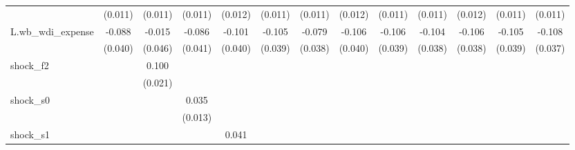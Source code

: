 {\begin{tabular}{l*{12}{c}}
            &     (0.011)         &     (0.011)         &     (0.011)         &     (0.012)         &     (0.011)         &     (0.011)         &     (0.012)         &     (0.011)         &     (0.011)         &     (0.012)         &     (0.011)         &     (0.011)         \\
\addlinespace
L.wb\_wdi\_expense&      -0.088\sym{**} &      -0.015         &      -0.086\sym{**} &      -0.101\sym{**} &      -0.105\sym{**} &      -0.079\sym{**} &      -0.106\sym{**} &      -0.106\sym{**} &      -0.104\sym{**} &      -0.106\sym{**} &      -0.105\sym{**} &      -0.108\sym{***}\\
            &     (0.040)         &     (0.046)         &     (0.041)         &     (0.040)         &     (0.039)         &     (0.038)         &     (0.040)         &     (0.039)         &     (0.038)         &     (0.038)         &     (0.039)         &     (0.037)         \\
\addlinespace
shock\_f2    &                     &       0.100\sym{***}&                     &                     &                     &                     &                     &                     &                     &                     &                     &                     \\
            &                     &     (0.021)         &                     &                     &                     &                     &                     &                     &                     &                     &                     &                     \\
\addlinespace
shock\_s0    &                     &                     &       0.035\sym{**} &                     &                     &                     &                     &                     &                     &                     &                     &                     \\
            &                     &                     &     (0.013)         &                     &                     &                     &                     &                     &                     &                     &                     &                     \\
\addlinespace
shock\_s1    &                     &                     &                     &       0.041\sym{**} &                     &                     &                     &                     &                     &                     &                     &                     \\

\end{tabular}}
